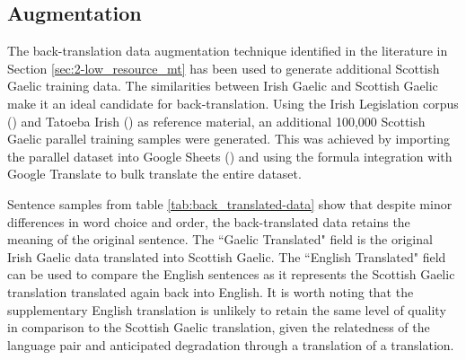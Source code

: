 \subsection{Augmentation}

The back-translation data augmentation technique identified in the literature in Section \ref{sec:2-low_resource_mt} has been used to generate additional Scottish Gaelic training data. The similarities between Irish Gaelic and Scottish Gaelic make it an ideal candidate for back-translation. Using the Irish Legislation corpus (\cite{irish_corpus_2017}) and Tatoeba Irish (\cite{tiedemann_opus_2012}) as reference material, an additional 100,000 Scottish Gaelic parallel training samples were generated. This was achieved by importing the parallel dataset into Google Sheets (\cite{google_sheets_2020}) and using the formula integration with Google Translate to bulk translate the entire dataset.


Sentence samples from table \ref{tab:back_translated-data} show that despite minor differences in word choice and order, the back-translated data retains the meaning of the original sentence. The ``Gaelic Translated" field is the original Irish Gaelic data translated into Scottish Gaelic. The ``English Translated" field can be used to compare the English sentences as it represents the Scottish Gaelic translation translated again back into English. It is worth noting that the supplementary English translation is unlikely to retain the same level of quality in comparison to the Scottish Gaelic translation, given the relatedness of the language pair and anticipated degradation through a translation of a translation.

